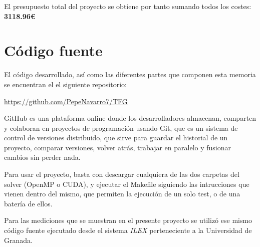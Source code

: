 El presupuesto total del proyecto se obtiene por tanto sumando todos los costes: \textbf{3118.96\euro}


\chapter{Código fuente}

El código desarrollado, así como las diferentes partes que componen esta memoria se encuentran el el siguiente repositorio:

\url{https://github.com/PepeNavarro7/TFG}

GitHub es una plataforma online donde los desarrolladores almacenan, comparten y colaboran en proyectos de programación usando Git, que es un sistema de control de versiones distribuido, que sirve para guardar el historial de un proyecto, comparar versiones, volver atrás, trabajar en paralelo y fusionar cambios sin perder nada.

Para usar el proyecto, basta con descargar cualquiera de las dos carpetas del solver (OpenMP o CUDA), y ejecutar el Makefile siguiendo las intrucciones que vienen dentro del mismo, que permiten la ejecución de un solo test, o de una batería de ellos.

Para las mediciones que se muestran en el presente proyecto se utilizó ese mismo código fuente ejecutado desde el sistema \textit{ILEX} perteneciente a la Universidad de Granada.